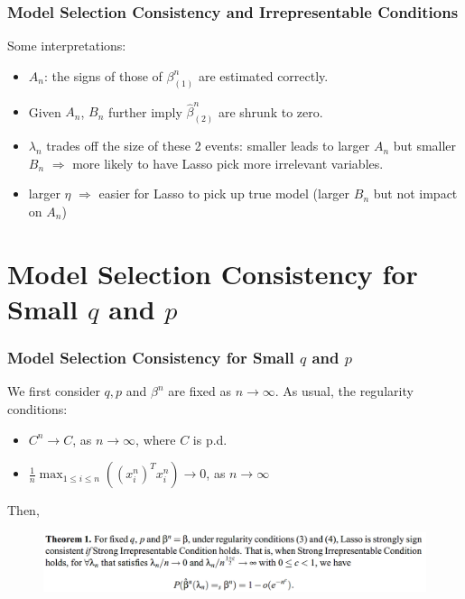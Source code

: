 \documentclass{beamer}
\begin{document}
	\begin{frame}
		\frametitle{Model Selection Consistency and Irrepresentable Conditions}
		Some interpretations:
		\begin{itemize}
			\item 
			$A_n$: the signs of those of $\beta_{(1)}^n$ are estimated correctly.
			\item
			Given $A_n$, $B_n$ further imply $\hat{\beta}^n_{(2)}$ are shrunk to zero.
			\item
			$\lambda_n$ trades off the size of these 2 events: smaller leads to larger $A_n$ but smaller $B_n$ $\Rightarrow$ more likely to have Lasso pick more irrelevant variables.
			\item
			larger $\eta$  $\Rightarrow$ easier for Lasso to pick up true model (larger $B_n$ but not impact on $A_n$)
		\end{itemize}
	\end{frame}
	
	
	\section{Model Selection Consistency for Small $q$ and $p$}
	
	\begin{frame}
		\frametitle{Model Selection Consistency for Small $q$ and $p$}
		We first consider $q, p$ and $\beta^n$ are fixed as $n\to \infty$. As usual, the regularity conditions:
		\begin{itemize}
			\item 
			$C^n\to C$, as $n\to \infty$, where $C$ is p.d.
			\item
			$\frac{1}{n}\max_{1\leq i\leq n}((x_i^n)^Tx_i^n) \to 0$, as $n \to \infty$
		\end{itemize}
		Then,
		\begin{figure}
			\includegraphics[width=1\linewidth]{image006.png}
		\end{figure}
	\end{frame}
	
\end{document}
